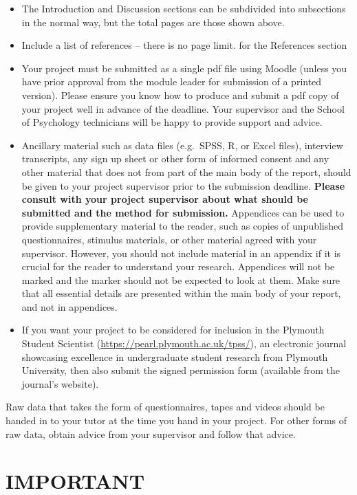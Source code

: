 \documentclass[
]{book}
\begin{document}
\begin{itemize}
\item
  The Introduction and Discussion sections can be subdivided into subsections in the normal way, but the total pages are those shown above.
\item
  Include a list of references -- there is no page limit. for the References section
\item
  Your project must be submitted as a single pdf file using Moodle (unless you have prior approval from the module leader for submission of a printed version). Please ensure you know how to produce and submit a pdf copy of your project well in advance of the deadline. Your supervisor and the School of Psychology technicians will be happy to provide support and advice.
\item
  Ancillary material such as data files (e.g.~SPSS, R, or Excel files), interview transcripts, any sign up sheet or other form of informed consent and any other material that does not from part of the main body of the report, should be given to your project supervisor prior to the submission deadline. \textbf{Please consult with your project supervisor about what should be submitted and the method for submission.} Appendices can be used to provide supplementary material to the reader, such as copies of unpublished questionnaires, stimulus materials, or other material agreed with your supervisor. However, you should not include material in an appendix if it is crucial for the reader to understand your research. Appendices will not be marked and the marker should not be expected to look at them. Make sure that all essential details are presented within the main body of your report, and not in appendices.
\item
  If you want your project to be considered for inclusion in the Plymouth Student Scientist (\url{https://pearl.plymouth.ac.uk/tpss/}), an electronic journal showcasing excellence in undergraduate student research from Plymouth University, then also submit the signed permission form (available from the journal's website).
\end{itemize}

Raw data that takes the form of questionnaires, tapes and videos should be handed in to your tutor at the time you hand in your project. For other forms of raw data, obtain advice from your supervisor and follow that advice.

\section{IMPORTANT}\label{important}
\end{document}
